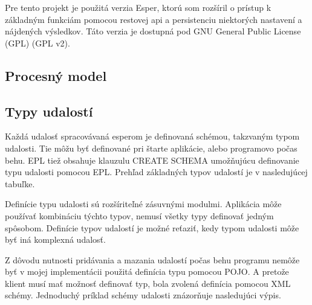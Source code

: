 	Pre tento projekt je použitá verzia Esper, ktorú som rozšíril o prístup k základným funkciám pomocou restovej api a persistenciu niektorých nastavení a nájdených výsledkov. Táto verzia je dostupná pod GNU General Public License (GPL) (GPL v2).

	\subsection{Procesný model}

	\subsection{Typy udalostí}
	Každá udalosť spracovávaná esperom je definovaná schémou, takzvaným typom udalosti. Tie môžu byť definované pri štarte aplikácie, alebo programovo počas behu. EPL tiež obsahuje klauzulu CREATE SCHEMA umožňujúcu definovanie typu udalosti pomocou EPL. Prehľad základných typov udalostí je v nasledujúcej tabuľke.

	
	Definície typu udalosti sú rozšíriteľné zásuvnými modulmi. Aplikácia môže používať kombináciu týchto typov, nemusí všetky typy definovať jedným spôsobom. Definície typov udalostí je možné reťaziť, kedy typom udalosti môže byť iná komplexná udalosť.
	
	Z dôvodu nutnosti pridávania a mazania udalostí počas behu programu nemôže byť v mojej implementácii použitá definícia typu pomocou POJO. A pretože klient musí mať možnosť definovať typ, bola zvolená definícia pomocou XML schémy. Jednoduchý príklad schémy udalosti znázorňuje nasledujúci výpis. 
	
